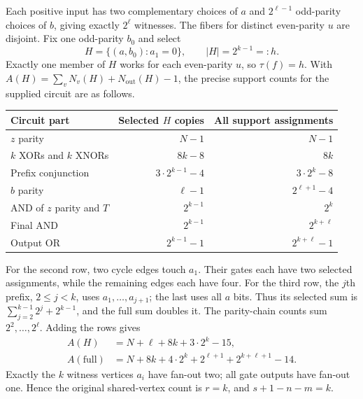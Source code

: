 Each positive input has two complementary choices of $a$ and
$2^{\ell-1}$ odd-parity choices of $b$, giving exactly $2^\ell$
witnesses. The fibers for distinct even-parity $u$ are disjoint. Fix
one odd-parity $b_0$ and select
\[
 H=\{(a,b_0):a_1=0\},\qquad |H|=2^{k-1}=:h.
\]
Exactly one member of $H$ works for each even-parity $u$, so
$\tau(f)=h$. With
$A(H)=\sum_v N_v(H)+N_{\mathrm{out}}(H)-1$, the precise support
counts for the supplied circuit are as follows.

\begin{center}\small
\begin{tabular}{@{}lrr@{}}
\toprule
Circuit part & Selected $H$ copies & All support assignments\\
\midrule
$z$ parity & $N-1$ & $N-1$\\
$k$ XORs and $k$ XNORs & $8k-8$ & $8k$\\
Prefix conjunction & $3\cdot2^{k-1}-4$ & $3\cdot2^k-8$\\
$b$ parity & $\ell-1$ & $2^{\ell+1}-4$\\
AND of $z$ parity and $T$ & $2^{k-1}$ & $2^k$\\
Final AND & $2^{k-1}$ & $2^{k+\ell}$\\
Output OR & $2^{k-1}-1$ & $2^{k+\ell}-1$\\
\bottomrule
\end{tabular}
\end{center}

For the second row, two cycle edges touch $a_1$. Their gates each have
two selected assignments, while the remaining edges each have four.
For the third row, the $j$th prefix, $2\le j<k$, uses
$a_1,\ldots,a_{j+1}$; the last uses all $a$ bits. Thus its selected
sum is $\sum_{j=2}^{k-1}2^j+2^{k-1}$, and the full sum doubles it.
The parity-chain counts sum $2^2,\ldots,2^\ell$. Adding the rows gives
\begin{align*}
 A(H)&=N+\ell+8k+3\cdot2^k-15,\\
 A(\text{full})&=N+8k+4\cdot2^k+2^{\ell+1}+2^{k+\ell+1}-14.
\end{align*}
Exactly the $k$ witness vertices $a_i$ have fan-out two; all gate
outputs have fan-out one. Hence the original shared-vertex count is
$r=k$, and $s+1-n-m=k$.


